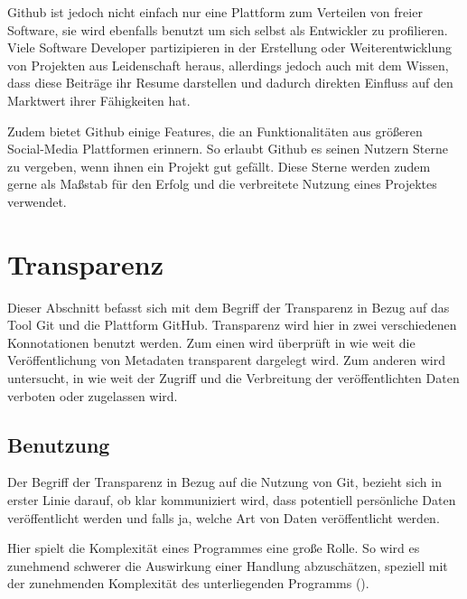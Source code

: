 \documentclass[12pt,a4paper]{article}
\begin{document}
Github ist jedoch nicht einfach nur eine Plattform zum Verteilen von freier Software, sie wird ebenfalls benutzt um sich selbst als Entwickler zu profilieren.
Viele Software Developer partizipieren in der Erstellung oder Weiterentwicklung von Projekten aus Leidenschaft heraus, allerdings jedoch auch mit dem Wissen, dass diese Beiträge ihr Resume darstellen und dadurch direkten Einfluss auf den Marktwert ihrer Fähigkeiten hat.

Zudem bietet Github einige Features, die an Funktionalitäten aus größeren Social-Media Plattformen erinnern.
So erlaubt Github es seinen Nutzern Sterne zu vergeben, wenn ihnen ein Projekt gut gefällt.
Diese Sterne werden zudem gerne als Maßstab für den Erfolg und die verbreitete Nutzung eines Projektes verwendet.

\section{Transparenz}

Dieser Abschnitt befasst sich mit dem Begriff der Transparenz in Bezug auf das Tool Git und die Plattform GitHub.
Transparenz wird hier in zwei verschiedenen Konnotationen benutzt werden.
Zum einen wird überprüft in wie weit die Veröffentlichung von Metadaten transparent dargelegt wird.
Zum anderen wird untersucht, in wie weit der Zugriff und die Verbreitung der veröffentlichten Daten verboten oder zugelassen wird.

\subsection{Benutzung}
Der Begriff der Transparenz in Bezug auf die Nutzung von Git, bezieht sich in erster Linie darauf, ob klar kommuniziert wird, dass potentiell persönliche Daten veröffentlicht werden und falls ja, welche Art von Daten veröffentlicht werden.

Hier spielt die Komplexität eines Programmes eine große Rolle.
So wird es zunehmend schwerer die Auswirkung einer Handlung abzuschätzen, speziell mit der zunehmenden Komplexität des unterliegenden Programms (\cite[p. 2]{article:dataethics}).
\end{document}
